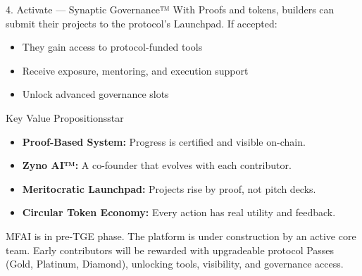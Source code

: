\begin{mfai-phase}{4. Activate — Synaptic Governance™}
With Proofs and tokens, builders can submit their projects to the protocol’s Launchpad.  
If accepted:
\begin{itemize}
  \item They gain access to protocol-funded tools
  \item Receive exposure, mentoring, and execution support
  \item Unlock advanced governance slots
\end{itemize}
\end{mfai-phase}


\begin{mfai-box}{Key Value Propositions}{star}
\begin{itemize}
  \item \textbf{Proof-Based System:} Progress is certified and visible on-chain.
  \item \textbf{Zyno AI™:} A co-founder that evolves with each contributor.
  \item \textbf{Meritocratic Launchpad:} Projects rise by proof, not pitch decks.
  \item \textbf{Circular Token Economy:} Every action has real utility and feedback.
\end{itemize}
\end{mfai-box}

\begin{mfai-note}
MFAI is in pre-TGE phase. The platform is under construction by an active core team. Early contributors will be rewarded with upgradeable protocol Passes (Gold, Platinum, Diamond), unlocking tools, visibility, and governance access.
\end{mfai-note}


